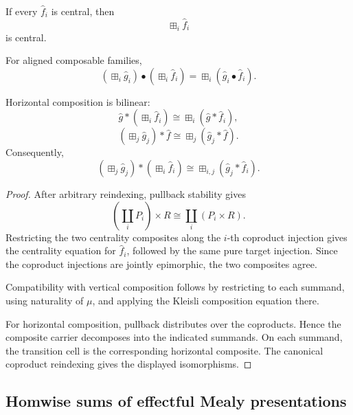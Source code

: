 \begin{proposition}
\label{prop:central-homwise-sums}
If every \(\widehat f_i\) is central, then
\[
    \boxplus_i\widehat f_i
\]
is central.

For aligned composable families,
\[
    \left(
        \boxplus_i\widehat g_i
    \right)
    \bullet
    \left(
        \boxplus_i\widehat f_i
    \right)
    =
    \boxplus_i
    \left(
        \widehat g_i\bullet\widehat f_i
    \right).
\]

Horizontal composition is bilinear:
\[
    \widehat g
    \ast
    \left(
        \boxplus_i\widehat f_i
    \right)
    \cong
    \boxplus_i
    \left(
        \widehat g\ast\widehat f_i
    \right),
\]
\[
    \left(
        \boxplus_j\widehat g_j
    \right)
    \ast
    \widehat f
    \cong
    \boxplus_j
    \left(
        \widehat g_j\ast\widehat f
    \right).
\]
Consequently,
\[
    \left(
        \boxplus_j\widehat g_j
    \right)
    \ast
    \left(
        \boxplus_i\widehat f_i
    \right)
    \cong
    \boxplus_{i,j}
    \left(
        \widehat g_j\ast\widehat f_i
    \right).
\]
\end{proposition}

\begin{proof}
After arbitrary reindexing, pullback stability gives
\[
    \left(
        \coprod_iP_i
    \right)
    \times R
    \cong
    \coprod_i(P_i\times R).
\]
Restricting the two centrality composites along the \(i\)-th coproduct
injection gives the centrality equation for \(\widehat f_i\), followed by the
same pure target injection.  Since the coproduct injections are jointly
epimorphic, the two composites agree.

Compatibility with vertical composition follows by restricting to each
summand, using naturality of \(\mu\), and applying the Kleisli composition
equation there.

For horizontal composition, pullback distributes over the coproducts.
Hence the composite carrier decomposes into the indicated summands.  On each
summand, the transition cell is the corresponding horizontal composite.
The canonical coproduct reindexing gives the displayed isomorphisms.
\end{proof}

\subsection{Homwise sums of effectful Mealy presentations}
\label{subsec:homwise-sums-effectful-mealy}

